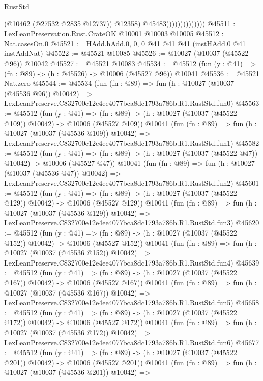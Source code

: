 \begin{lexlean}{RustStd}
\begin{coremodule}
                                  (@10462 (@27532 @2835 @12737))
                                  @12358)
                                @45483))))))))))))))
@45511 := LexLeanPreservation.Rust.CrateOK @10001 @10003 @10005
@45512 := Nat.casesOn.{0}
@45521 := HAdd.hAdd.{0, 0, 0} @41 @41 @41 (instHAdd.{0} @41 instAddNat)
@45522 := @45521 @10085
@45526 := @10027 (@10037 (@45522 @96)) @10042
@45527 := @45521 @10083
@45534 := @45512 (fun (y : @41) => (fn : @89) -> (h : @45526) -> @10006 (@45527 @96)) @10041
@45536 := @45521 Nat.zero
@45544 := @45534
    (fun (fn : @89) =>
    fun (h : @10027 (@10037 (@45536 @96)) @10042) =>
    LexLeanPreserve.C832700e12e4ee4077bca8dc1793a786b.R1.RustStd.fun0)
@45563 := @45512
    (fun (y : @41) =>
    (fn : @89) -> (h : @10027 (@10037 (@45522 @109)) @10042) -> @10006 (@45527 @109))
    @10041
    (fun (fn : @89) =>
    fun (h : @10027 (@10037 (@45536 @109)) @10042) =>
    LexLeanPreserve.C832700e12e4ee4077bca8dc1793a786b.R1.RustStd.fun1)
@45582 := @45512
    (fun (y : @41) =>
    (fn : @89) -> (h : @10027 (@10037 (@45522 @47)) @10042) -> @10006 (@45527 @47))
    @10041
    (fun (fn : @89) =>
    fun (h : @10027 (@10037 (@45536 @47)) @10042) =>
    LexLeanPreserve.C832700e12e4ee4077bca8dc1793a786b.R1.RustStd.fun2)
@45601 := @45512
    (fun (y : @41) =>
    (fn : @89) -> (h : @10027 (@10037 (@45522 @129)) @10042) -> @10006 (@45527 @129))
    @10041
    (fun (fn : @89) =>
    fun (h : @10027 (@10037 (@45536 @129)) @10042) =>
    LexLeanPreserve.C832700e12e4ee4077bca8dc1793a786b.R1.RustStd.fun3)
@45620 := @45512
    (fun (y : @41) =>
    (fn : @89) -> (h : @10027 (@10037 (@45522 @152)) @10042) -> @10006 (@45527 @152))
    @10041
    (fun (fn : @89) =>
    fun (h : @10027 (@10037 (@45536 @152)) @10042) =>
    LexLeanPreserve.C832700e12e4ee4077bca8dc1793a786b.R1.RustStd.fun4)
@45639 := @45512
    (fun (y : @41) =>
    (fn : @89) -> (h : @10027 (@10037 (@45522 @167)) @10042) -> @10006 (@45527 @167))
    @10041
    (fun (fn : @89) =>
    fun (h : @10027 (@10037 (@45536 @167)) @10042) =>
    LexLeanPreserve.C832700e12e4ee4077bca8dc1793a786b.R1.RustStd.fun5)
@45658 := @45512
    (fun (y : @41) =>
    (fn : @89) -> (h : @10027 (@10037 (@45522 @172)) @10042) -> @10006 (@45527 @172))
    @10041
    (fun (fn : @89) =>
    fun (h : @10027 (@10037 (@45536 @172)) @10042) =>
    LexLeanPreserve.C832700e12e4ee4077bca8dc1793a786b.R1.RustStd.fun6)
@45677 := @45512
    (fun (y : @41) =>
    (fn : @89) -> (h : @10027 (@10037 (@45522 @201)) @10042) -> @10006 (@45527 @201))
    @10041
    (fun (fn : @89) =>
    fun (h : @10027 (@10037 (@45536 @201)) @10042) =>

\end{coremodule}
\end{lexlean}
